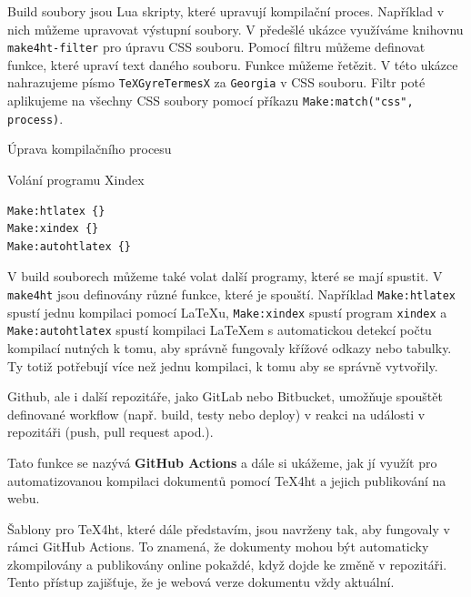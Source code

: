 Build soubory jsou Lua skripty, které upravují kompilační proces. Například 
v nich můžeme upravovat výstupní soubory. V předešlé ukázce využíváme 
knihovnu \texttt{make4ht-filter} pro úpravu CSS souboru. Pomocí filtru 
můžeme definovat funkce, které upraví text daného souboru. Funkce můžeme řetězit.
V této ukázce nahrazujeme písmo \texttt{TeXGyreTermesX} za \texttt{Georgia} v CSS souboru.
Filtr poté aplikujeme na všechny CSS soubory pomocí příkazu \texttt{Make:match("css", process)}.

\begin{frame}[fragile]{Úprava kompilačního procesu}
\begin{block}{Volání programu Xindex}
\begin{verbatim}
Make:htlatex {} 
Make:xindex {} 
Make:autohtlatex {}
\end{verbatim}
\end{block}

\end{frame}

V build souborech můžeme také volat další programy, které se mají spustit. V \texttt{make4ht}
jsou definovány různé funkce, které je spouští. Například \texttt{Make:htlatex} spustí
jednu kompilaci pomocí \LaTeX u, \texttt{Make:xindex} spustí program \texttt{xindex}
a \texttt{Make:autohtlatex} spustí kompilaci \LaTeX em s automatickou detekcí počtu kompilací
nutných k tomu, aby správně fungovaly křížové odkazy nebo tabulky. Ty totiž potřebují více než jednu kompilaci, k tomu
aby se správně vytvořily.



Github, ale i další repozitáře, jako GitLab nebo Bitbucket,  umožňuje
spouštět definované workflow (např. build, testy nebo deploy) v reakci na
události v repozitáři (push, pull request apod.).

Tato funkce se nazývá \textbf{GitHub Actions} a dále si ukážeme, jak jí využít pro automatizovanou
kompilaci dokumentů pomocí \TeX4ht a jejich publikování na webu.

Šablony pro \TeX4ht, které dále představím, jsou navrženy tak, aby fungovaly v rámci GitHub Actions. To
znamená, že dokumenty mohou být automaticky zkompilovány a publikovány online
pokaždé, když dojde ke změně v repozitáři. Tento přístup zajišťuje, že je
webová verze dokumentu vždy aktuální.


